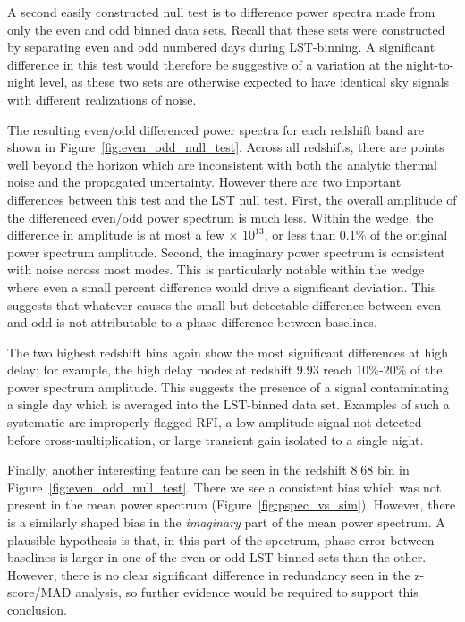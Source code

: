 A second easily constructed null test is to difference
power spectra made from only the even and odd binned data sets.
Recall that these sets were constructed by separating even and odd
numbered days during LST-binning. A significant difference in this test would therefore be suggestive of
a variation at the night-to-night level,
as these two sets are otherwise
expected to have identical sky signals
with different realizations of noise.

The resulting even/odd differenced power spectra for each redshift band
are shown in Figure~\ref{fig:even_odd_null_test}.
Across all redshifts, there are points well beyond the
horizon which are inconsistent with both the analytic thermal noise
and the propagated uncertainty. However there are two important differences
between this test and the LST null test. First, the overall amplitude of the differenced even/odd power spectrum is much less. Within the wedge, the
difference in amplitude is at most a few $\times$ $10^{13}$, or less than 0.1\% of the original power spectrum amplitude.
Second, the imaginary power spectrum is consistent with
noise across most modes. This is particularly notable within the wedge where even a small percent difference would drive a significant deviation. This
 suggests that whatever causes the small but detectable difference between
 even and odd is not attributable to a phase difference between baselines.

The two highest redshift
bins again show the most significant differences at high delay; for example, the high delay modes at redshift 9.93 reach $ 10\%$-$20\% $ of the power spectrum amplitude. This suggests the presence of a signal contaminating a single day which is averaged into the LST-binned data set.
Examples of such a systematic are improperly flagged RFI, a low amplitude signal not detected before cross-multiplication, or large transient gain isolated to a single night.

Finally, another interesting feature can be seen in the redshift 8.68 bin in Figure~\ref{fig:even_odd_null_test}.
There we see a consistent bias which was not present in the mean power spectrum (Figure~\ref{fig:pspec_vs_sim}).  However, there is a similarly shaped bias in the \emph{imaginary} part of the mean power spectrum. A plausible hypothesis
is that, in this part of the spectrum, phase error between baselines is larger in one of the even or odd LST-binned sets than the other. However, there is no clear significant difference in redundancy seen in the z-score/MAD analysis, so further evidence would be required to support this conclusion.

